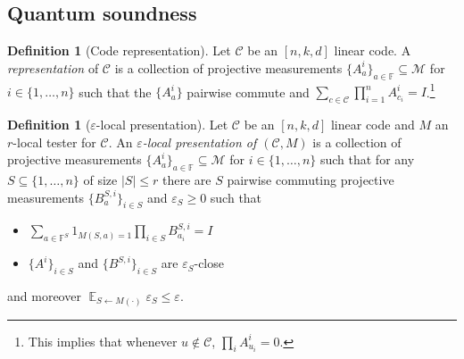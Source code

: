 \documentclass[11pt]{article}
\theoremstyle{definition}
\newtheorem{definition}[theorem]{Definition}
\newcommand{\code}{\mathcal{C}}
\newcommand{\Id}{\ensuremath{I}}
\DeclareMathOperator*{\Expectation}{\mathbb{E}}
\newcommand{\Es}[1]{\Expectation_{#1}}
\newcommand{\field}{\mathbb{F}}
\newcommand{\N}{\ensuremath{\mathbb{N}}}
\newcommand{\F}{\ensuremath{\mathbb{F}}}
\newcommand{\mM}{\ensuremath{\mathcal{M}}}
\newcommand{\eps}{\varepsilon}
\begin{document}

\subsection{Quantum soundness}

\begin{definition}[Code representation]
Let $\code$ be an $[n,k,d]$ linear code. A \emph{representation} of $\code$ is a collection of projective measurements $\{A^i_a\}_{a\in\field} \subseteq\mM$ for $i\in\{1,\ldots,n\}$ such that the $\{A^i_a\}$ pairwise commute and $\sum_{c\in\code} \prod_{i=1}^n A^i_{c_i}=\Id$.\footnote{This implies that whenever $u\notin \code$, $\prod_i A^i_{u_i}=0$.} 
\end{definition}



\begin{definition}[$\eps$-local presentation]
Let $\code$ be an $[n,k,d]$ linear code and $M$ an $r$-local tester for $\code$. An \emph{$\eps$-local presentation of $(\code,M)$} is a collection of projective measurements $\{A^i_a\}_{a\in\field} \subseteq\mM$ for $i\in\{1,\ldots,n\}$ such that for any $S\subseteq\{1,\ldots,n\}$ of size $|S|\leq r$ there are $S$ pairwise commuting projective measurements $\{B^{S,i}_a\}_{i\in S}$ and $\eps_S\geq 0$ such that 
\begin{itemize}
\item $\sum_{a\in \F^S} 1_{M(S,a)=1} \prod_{i\in S} B^{S,i}_{a_i}= \Id$
\item $\{A^i\}_{i\in S}$ and $\{B^{S,i}\}_{i\in S}$ are $\eps_S$-close
\end{itemize} 
and moreover $\Es{S\leftarrow M(\cdot)} \eps_S \leq \eps$. 
\end{definition}
\end{document}
